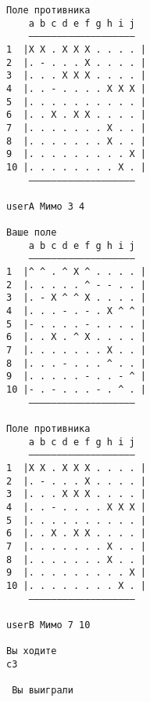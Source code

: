 \documentclass[a4paper, 14pt]{article}
\begin{document}
\begin{verbatim}
Поле противника
    a b c d e f g h i j
    ———————————————————
1  |X X . X X X . . . . |
2  |. - . . . X . . . . |
3  |. . . X X X . . . . |
4  |. . - . . . . X X X |
5  |. . . . . . . . . . |
6  |. . X . X X . . . . |
7  |. . . . . . . X . . |
8  |. . . . . . . X . . |
9  |. . . . . . . . . X |
10 |. . . . . . . . X . |
    ———————————————————

userA Мимо 3 4

Ваше поле
    a b c d e f g h i j
    ———————————————————
1  |^ ^ . ^ X ^ . . . . |
2  |. . . . . ^ - - . . |
3  |. - X ^ ^ X . . . . |
4  |. . . - . - . X ^ ^ |
5  |- . . . . - . . . . |
6  |. . X . ^ X . . . . |
7  |. . . . . . . X . . |
8  |. . . - . . . ^ . . |
9  |. . . . . - . . - ^ |
10 |- . - . . . - . ^ . |
    ———————————————————

Поле противника
    a b c d e f g h i j
    ———————————————————
1  |X X . X X X . . . . |
2  |. - . . . X . . . . |
3  |. . . X X X . . . . |
4  |. . - . . . . X X X |
5  |. . . . . . . . . . |
6  |. . X . X X . . . . |
7  |. . . . . . . X . . |
8  |. . . . . . . X . . |
9  |. . . . . . . . . X |
10 |. . . . . . . . X . |
    ———————————————————

userB Мимо 7 10

Вы ходите
c3

 Вы выиграли
\end{verbatim}
\end{document}
